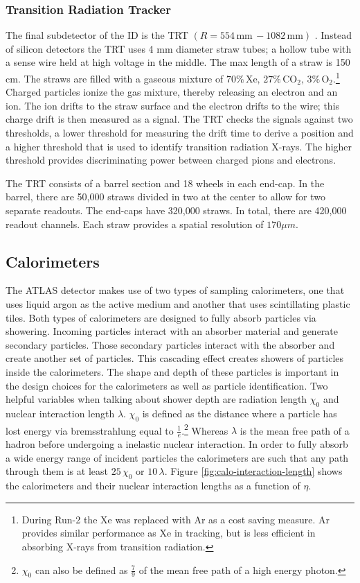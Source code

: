 		\subsubsection{Transition Radiation Tracker}\label{sssec:TRT}
		The final subdetector of the ID is the TRT $(R=554 \, \mathrm{mm} \, - 1082 \, \mathrm{mm})$ . Instead of silicon detectors the TRT uses 4 mm diameter straw tubes; a hollow tube with a sense wire held at high voltage in the middle. The max length of a straw is 150 cm. The straws are filled with a gaseous mixture of $70\% \, \mathrm{Xe,} \, 27\% \, \mathrm{CO}_2, \, 3\% \, \mathrm{O}_2$.\footnote{During Run-2 the Xe was replaced with Ar as a cost saving measure. Ar provides similar performance as Xe in tracking, but is less efficient in absorbing X-rays from transition radiation.} Charged particles ionize the gas mixture, thereby releasing an electron and an ion. The ion drifts to the straw surface and the electron drifts to the wire; this charge drift is then measured as a signal. The TRT checks the signals against two thresholds, a lower threshold for measuring the drift time to derive a position and a higher threshold that is used to identify transition radiation X-rays. The higher threshold provides discriminating power between charged pions and electrons.

		The TRT consists of a barrel section and 18 wheels in each end-cap. In the barrel, there are 50,000 straws divided in two at the center to allow for two separate readouts. The end-caps have 320,000 straws. In total, there are 420,000 readout channels. Each straw provides a spatial resolution of $170 \mu m$. \cite{ATLAS-ID}

	\subsection{Calorimeters}\label{ssec:calorimeters}
	The ATLAS detector makes use of two types of sampling calorimeters, one that uses liquid argon as the active medium and another that uses scintillating plastic tiles. Both types of calorimeters are designed to fully absorb particles via showering. Incoming particles interact with an absorber material and generate secondary particles. Those secondary particles interact with the absorber and create another set of particles. This cascading effect creates showers of particles inside the calorimeters. The shape and depth of these particles is important in the design choices for the calorimeters as well as particle identification. Two helpful variables when talking about shower depth are radiation length $\chi_0$ and nuclear interaction length $\lambda$. $\chi_0$ is defined as the distance where a particle has lost energy via bremsstrahlung equal to $\frac{1}{e}$.\footnote{$\chi_0$ can also be defined as $\frac{7}{9}$ of the mean free path of a high energy photon.} Whereas $\lambda$ is the mean free path of a hadron before undergoing a inelastic nuclear interaction. In order to fully absorb a wide energy range of incident particles the calorimeters are such that any path through them is at least $25 \, \chi_0$ or $10 \, \lambda$. Figure \ref{fig:calo-interaction-length} shows the calorimeters and their nuclear interaction lengths as a function of $\eta$.

